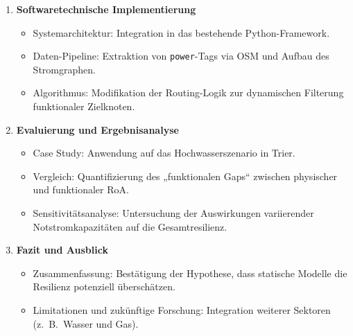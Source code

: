 \begin{enumerate}
    \item \textbf{Softwaretechnische Implementierung}
    \begin{itemize}
        \item Systemarchitektur: Integration in das bestehende Python-Framework.
        \item Daten-Pipeline: Extraktion von \texttt{power}-Tags via OSM und Aufbau des Stromgraphen.
        \item Algorithmus: Modifikation der Routing-Logik zur dynamischen Filterung funktionaler Zielknoten.
    \end{itemize}

    \item \textbf{Evaluierung und Ergebnisanalyse}
    \begin{itemize}
        \item Case Study: Anwendung auf das Hochwasserszenario in Trier.
        \item Vergleich: Quantifizierung des „funktionalen Gaps“ zwischen physischer und funktionaler RoA\@.
        \item Sensitivitätsanalyse: Untersuchung der Auswirkungen variierender Notstromkapazitäten auf die Gesamtresilienz.
    \end{itemize}

    \item \textbf{Fazit und Ausblick}
    \begin{itemize}
        \item Zusammenfassung: Bestätigung der Hypothese, dass statische Modelle die Resilienz potenziell überschätzen.
        \item Limitationen und zukünftige Forschung: Integration weiterer Sektoren (z. B.\ Wasser und Gas).
    \end{itemize}
\end{enumerate}

